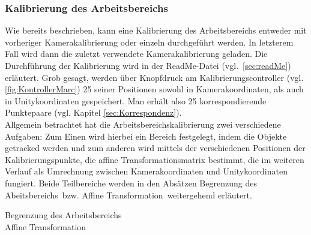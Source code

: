 \subsubsection{Kalibrierung des Arbeitsbereichs}\label{sec:planeCalib} 
Wie bereits beschrieben, kann eine Kalibrierung des Arbeitsbereichs entweder mit vorheriger Kamerakalibrierung oder einzeln durchgeführt werden. In letzterem Fall wird dann die zuletzt verwendete Kamerakalibrierung geladen. Die Durchführung der Kalibrierung wird in der ReadMe-Datei (vgl.~\ref{sec:readMe}) erläutert. Grob gesagt, werden über Knopfdruck am Kalibrierungscontroller (vgl. \ref{fig:KontrollerMarc}) 25 seiner Positionen sowohl in Kamerakoordinaten, als auch in Unitykoordinaten gespeichert. Man erhält also 25 korrespondierende Punktepaare (vgl. Kapitel \ref{sec:Korrespondenz}).\\
Allgemein betrachtet hat die Arbeitsbereichskalibrierung zwei verschiedene Aufgaben: Zum Einen wird hierbei ein Bereich festgelegt, indem die Objekte getracked werden und zum anderen wird mittels der verschiedenen Positionen der Kalibrierungspunkte, die affine Transformationsmatrix bestimmt, die im weiteren Verlauf als Umrechnung zwischen Kamerakoordinaten und Unitykoordinaten fungiert. Beide Teilbereiche werden in den Absätzen \grqq Begrenzung des Abeitsbereichs\grqq ~bzw. \grqq Affine Transformation\grqq ~weitergehend erläutert.
	
\begin{description}
\item[Begrenzung des Arbeitsbereichs] %
\item[Affine Transformation] %
\end{description}



